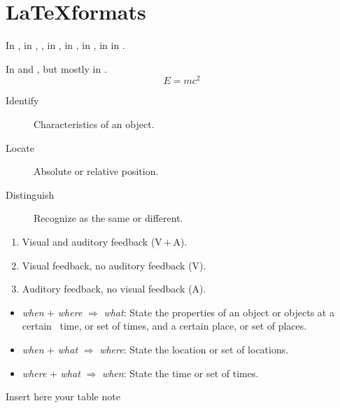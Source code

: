 \section{\LaTeX formats}

\lipsum[1]

In , in , , in , in , in , in  in .

In \cite{Abril07} and \cite{Cohen07}, but mostly in \cite{Abril07,Cohen07}.
\begin{equation}
E=mc^{2}
\label{eqn:sample}
\end{equation}


\begin{description}
	\item[Identify] Characteristics of an object.
	\item[Locate] Absolute or relative position.
	\item[Distinguish] Recognize as the same or different.
\end{description}


\begin{enumerate}
	\item Visual and auditory feedback (V\,$+$\,A).
	\item Visual feedback, no auditory feedback (V).
	\item Auditory feedback, no visual feedback (A).
\end{enumerate}


\begin{itemize}
	\item \textit{when} $+$ \textit{where} $\Rightarrow$
	\textit{what}: State the properties of an object or objects at a
	certain ~time, or set of times,  and a certain place, or set of places.
	\item \textit{when} $+$ \textit{what} $\Rightarrow$
	\textit{where}: State the location or set of locations.
	\item \textit{where} $+$ \textit{what} $\Rightarrow$
	\textit{when}: State the time or set of times.
\end{itemize}


\begin{table}[t]
\begin{tabnote}
Insert here your table note
\end{tabnote}
\label{tab:sample}
\end{table}


